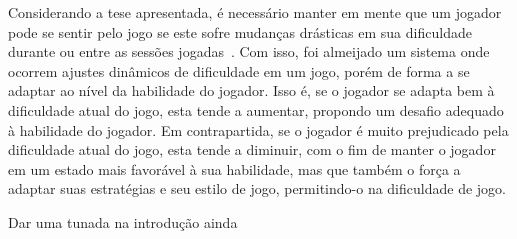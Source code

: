 Considerando a tese apresentada, é necessário manter em mente que um jogador pode se sentir \textquotedbl{} pelo jogo se este sofre mudanças drásticas em sua dificuldade durante ou entre as sessões jogadas~\citep{DynamicDiffAdjustment}. Com isso, foi almeijado um sistema onde ocorrem ajustes dinâmicos de dificuldade em um jogo, porém de forma a se adaptar ao nível da habilidade do jogador. Isso é, se o jogador se adapta bem à dificuldade atual do jogo, esta tende a aumentar, propondo um desafio adequado à habilidade do jogador. Em contrapartida, se o jogador é muito prejudicado pela dificuldade atual do jogo, esta tende a diminuir, com o fim de manter o jogador em um estado mais favorável à sua habilidade, mas que também o força a adaptar suas estratégias e seu estilo de jogo, permitindo-o \textquotedbl{} na dificuldade de jogo.

Dar uma tunada na introdução ainda

\textquotedbl{}



